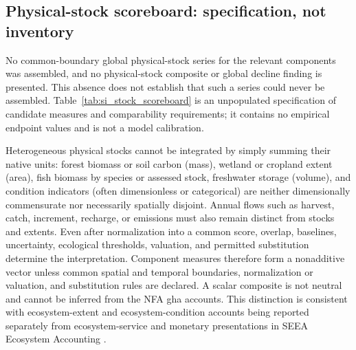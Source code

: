 \subsection{Physical-stock scoreboard: specification, not inventory}\label{si:stocks}

No common-boundary global physical-stock series for the relevant components was assembled, and no physical-stock composite or global decline finding is presented. This absence does not establish that such a series could never be assembled. Table~\ref{tab:si_stock_scoreboard} is an unpopulated specification of candidate measures and comparability requirements; it contains no empirical endpoint values and is not a model calibration.

Heterogeneous physical stocks cannot be integrated by simply summing their native units: forest biomass or soil carbon (mass), wetland or cropland extent (area), fish biomass by species or assessed stock, freshwater storage (volume), and condition indicators (often dimensionless or categorical) are neither dimensionally commensurate nor necessarily spatially disjoint. Annual flows such as harvest, catch, increment, recharge, or emissions must also remain distinct from stocks and extents. Even after normalization into a common score, overlap, baselines, uncertainty, ecological thresholds, valuation, and permitted substitution determine the interpretation. Component measures therefore form a nonadditive vector unless common spatial and temporal boundaries, normalization or valuation, and substitution rules are declared. A scalar composite is not neutral and cannot be inferred from the NFA gha accounts. This distinction is consistent with ecosystem-extent and ecosystem-condition accounts being reported separately from ecosystem-service and monetary presentations in SEEA Ecosystem Accounting \citep{UN2021SEEA_EA}.

